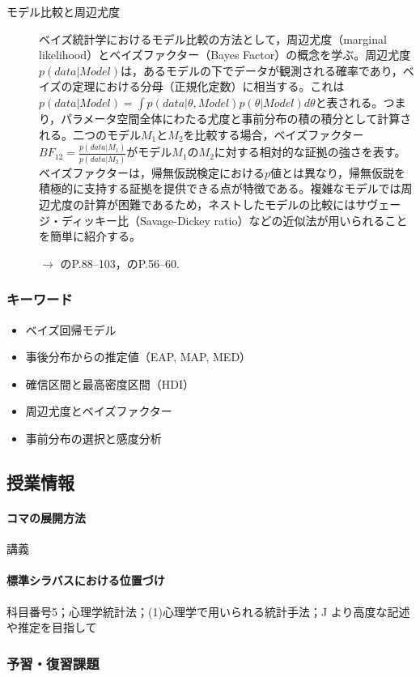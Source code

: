 \begin{description}
	\item[モデル比較と周辺尤度] ベイズ統計学におけるモデル比較の方法として，周辺尤度（marginal likelihood）とベイズファクター（Bayes Factor）の概念を学ぶ。周辺尤度$p(data|Model)$は，あるモデルの下でデータが観測される確率であり，ベイズの定理における分母（正規化定数）に相当する。これは$p(data|Model) = \int p(data|\theta, Model)p(\theta|Model)d\theta$と表される。つまり，パラメータ空間全体にわたる尤度と事前分布の積の積分として計算される。二つのモデル$M_1$と$M_2$を比較する場合，ベイズファクター$BF_{12} = \frac{p(data|M_1)}{p(data|M_2)}$がモデル$M_1$の$M_2$に対する相対的な証拠の強さを表す。ベイズファクターは，帰無仮説検定における$p$値とは異なり，帰無仮説を積極的に支持する証拠を提供できる点が特徴である。複雑なモデルでは周辺尤度の計算が困難であるため，ネストしたモデルの比較にはサヴェージ・ディッキー比（Savage-Dickey ratio）などの近似法が用いられることを簡単に紹介する。
	      \begin{flushright}
		      $\to$ \textcite{Lee201709}のP.88--103，\textcite{Toyoda201506}のP.56--60.
	      \end{flushright}

\end{description}
\subsubsection{キーワード}
\begin{itemize}
	\item ベイズ回帰モデル
	\item 事後分布からの推定値（EAP, MAP, MED）
	\item 確信区間と最高密度区間（HDI）
	\item 周辺尤度とベイズファクター
	\item 事前分布の選択と感度分析
\end{itemize}
\subsection{授業情報}
\paragraph{コマの展開方法}
講義
\paragraph{標準シラバスにおける位置づけ}
科目番号5；心理学統計法；(1)心理学で用いられる統計手法；J より高度な記述や推定を目指して
\subsubsection{予習・復習課題}
